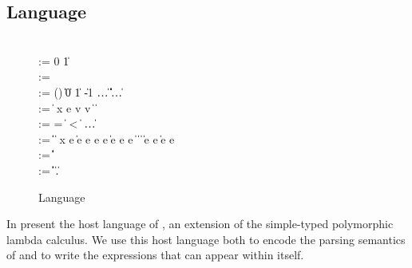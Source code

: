 \subsection{\Implang{} Language}
\label{sec:host-lang}
\begin{figure}[tp]
\small
\begin{bnf}
    \\

        \::= 0 \| 1 \\ 
       \::=  \\ 
    \::=
      () \| \itrue \| \ifalse \| 0 \| 1 \| -1 \| \dots \nlalt
      \ierr \| \data \| \off \| \iok \| \iecerr \| \iecpc \| \ldots \\

    \::= 
      \const \| %
       {\nrm x} e \nlalt
      \ipair v v \|  \|  \nlalt
       \\

    \::= 
      = \; \| \; < \; \| \inotop %
      \| \ldots \\

    \::= 
      \const \| \var \|  \|
       {\nrm x} e \| 
      \iapp e e \nlalt
       e \; e \|
      \iif e \; \ithen e \; \ielse e \nlalt
       \|  \|
       \|  \nlalt
       \nlalt
       \| \iappend e e \| \isub e {\nrm e}
      \\
      
    \::= 
      \iunitty \| \iboolty \| \iintty  \| 
      \invty \nlalt  \ibitsty \| \ioffty \| \iecty
  \\
   \meta{\ity} \::= 
      \ibasety \| \ityvar \| \iarrow \ity \ity \| \iprod \ity \ity \|
      \isum \ity \ity \nlalt
      \iseq \ity \| \forall \ityvar.\ity  \|
      \imu \ityvar \ity   
  
\end{bnf}
\caption{\Implang{} Language}
\label{fig:implang-syntax}
\end{figure}

In  present the host language of \ddc{}, an
extension of the simple-typed polymorphic lambda calculus. 
We use this host language both to encode the parsing semantics of \ddc{} 
and to write the expressions that can appear within \ddc{} itself.

